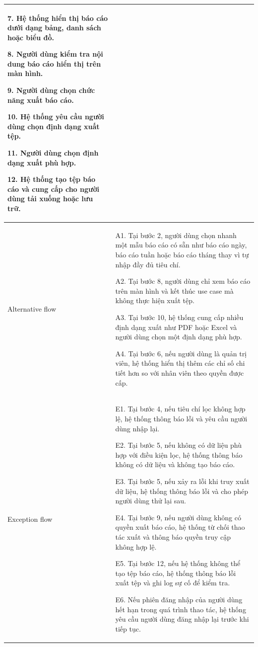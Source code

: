 \begin{center}
\begin{longtable}{|m{2.5cm}|m{13cm}|}
7. Hệ thống hiển thị báo cáo dưới dạng bảng, danh sách hoặc biểu đồ.

8. Người dùng kiểm tra nội dung báo cáo hiển thị trên màn hình.

9. Người dùng chọn chức năng xuất báo cáo.

10. Hệ thống yêu cầu người dùng chọn định dạng xuất tệp.

11. Người dùng chọn định dạng xuất phù hợp.

12. Hệ thống tạo tệp báo cáo và cung cấp cho người dùng tải xuống hoặc lưu trữ.\\
\hline
Alternative flow & 
A1. Tại bước 2, người dùng chọn nhanh một mẫu báo cáo có sẵn như báo cáo ngày, báo cáo tuần hoặc báo cáo tháng thay vì tự nhập đầy đủ tiêu chí.

A2. Tại bước 8, người dùng chỉ xem báo cáo trên màn hình và kết thúc use case mà không thực hiện xuất tệp.

A3. Tại bước 10, hệ thống cung cấp nhiều định dạng xuất như PDF hoặc Excel và người dùng chọn một định dạng phù hợp.

A4. Tại bước 6, nếu người dùng là quản trị viên, hệ thống hiển thị thêm các chỉ số chi tiết hơn so với nhân viên theo quyền được cấp.\\ 
\hline
Exception flow & 
E1. Tại bước 4, nếu tiêu chí lọc không hợp lệ, hệ thống thông báo lỗi và yêu cầu người dùng nhập lại.

E2. Tại bước 5, nếu không có dữ liệu phù hợp với điều kiện lọc, hệ thống thông báo không có dữ liệu và không tạo báo cáo.

E3. Tại bước 5, nếu xảy ra lỗi khi truy xuất dữ liệu, hệ thống thông báo lỗi và cho phép người dùng thử lại sau.

E4. Tại bước 9, nếu người dùng không có quyền xuất báo cáo, hệ thống từ chối thao tác xuất và thông báo quyền truy cập không hợp lệ.

E5. Tại bước 12, nếu hệ thống không thể tạo tệp báo cáo, hệ thống thông báo lỗi xuất tệp và ghi log sự cố để kiểm tra.

E6. Nếu phiên đăng nhập của người dùng hết hạn trong quá trình thao tác, hệ thống yêu cầu người dùng đăng nhập lại trước khi tiếp tục.\\
\hline
\end{longtable}
\end{center}
